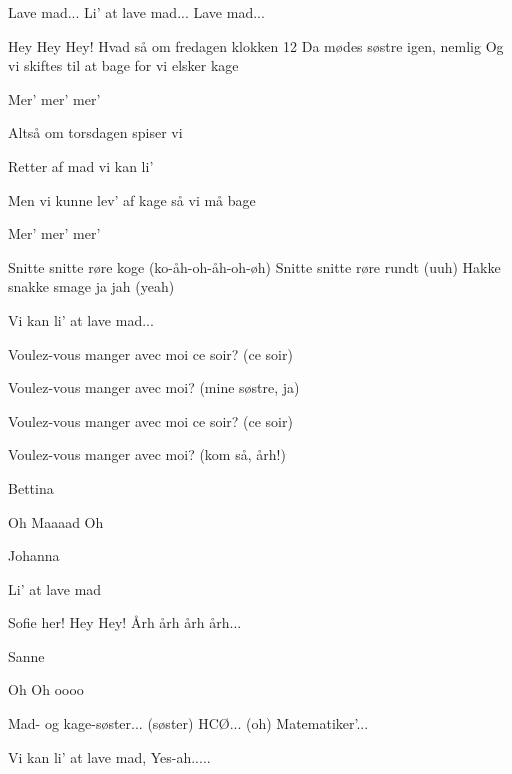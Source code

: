\documentclass[a4paper,11pt]{article}
\begin{document}
\begin{song}
 Lave mad... Li' at lave mad... Lave mad...

 Hey Hey Hey!
Hvad så om fredagen klokken 12
Da mødes søstre igen, nemlig
Og vi skiftes til at bage for vi elsker kage

 Mer'
 mer'
 mer'

 Altså om torsdagen spiser vi

 Retter af mad vi kan li'

 Men vi kunne lev' af kage så vi må bage

 Mer'
 mer'
 mer'

 Snitte snitte røre koge (ko-åh-oh-åh-oh-øh)
Snitte snitte røre rundt (uuh)
Hakke snakke smage ja jah (yeah)

 Vi kan li' at lave mad...

Voulez-vous manger avec moi ce soir? (ce soir)

Voulez-vous manger avec moi? (mine søstre, ja)

Voulez-vous manger avec moi ce soir? (ce soir)

Voulez-vous manger avec moi? (kom så, årh!)

 Bettina

 Oh Maaaad Oh

 Johanna

 Li' at lave mad

 Sofie her!
Hey Hey! Årh årh årh årh...

 Sanne

 Oh Oh oooo

 Mad- og kage-søster... (søster)
HCØ... (oh)
Matematiker'...

 Vi kan li' at lave mad, Yes-ah.....
\end{song}
\end{document}
